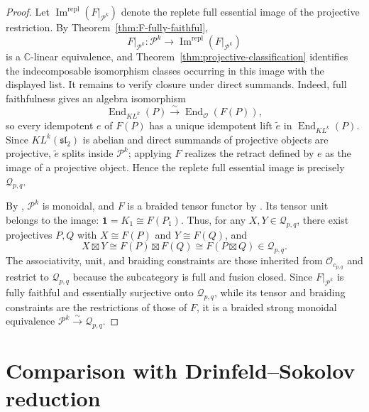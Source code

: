 \documentclass[12pt,leqno]{amsart}
\numberwithin{equation}{section}
\newcommand{\End}{\operatorname{End}}
\newcommand{\KL}{KL}
\newcommand{\Oc}{\mathcal O}
\def\C{\mathbb{C}}
\begin{document}
\begin{proof}
Let $\operatorname{Im}^{\mathrm{repl}}(F|_{\mathcal P^k})$ denote the
replete full essential image of the projective restriction.  By
Theorem~\ref{thm:F-fully-faithful},
\[
 F|_{\mathcal P^k}:\mathcal P^k
 \longrightarrow \operatorname{Im}^{\mathrm{repl}}(F|_{\mathcal P^k})
\]
is a $\C$-linear equivalence, and Theorem~\ref{thm:projective-classification}
identifies the indecomposable isomorphism classes occurring in this image
with the displayed list.  It remains to verify closure under direct
summands.  Indeed, full faithfulness gives an algebra isomorphism
\[
 \End_{\KL^k}(P)\xrightarrow{\sim}\End_{\Oc}(F(P)),
\]
so every idempotent $e$ of $F(P)$ has a unique idempotent lift
$\widetilde e$ in $\End_{\KL^k}(P)$.  Since $\KL^k(\mathfrak{sl}_2)$ is
abelian and direct summands of projective objects are projective,
$\widetilde e$ splits inside $\mathcal P^k$; applying $F$ realizes the
retract defined by $e$ as the image of a projective object.  Hence the
replete full essential image is precisely $\mathcal Q_{p,q}$.

By \cite[Theorem~6.6]{McRaeYang}, $\mathcal P^k$ is monoidal, and $F$ is
a braided tensor functor by \cite[Theorem~7.15]{McRaeYang}.  Its tensor
unit belongs to the image:
$\mathbf1=K_1\cong F(P_1)$.  Thus, for any $X,Y\in\mathcal Q_{p,q}$, there exist projectives $P,Q$
with $X\cong F(P)$ and $Y\cong F(Q)$, and
\[
 X\boxtimes Y\cong F(P)\boxtimes F(Q)
 \cong F(P\boxtimes Q)\in\mathcal Q_{p,q}.
\]
The associativity, unit, and braiding constraints are those inherited
from $\Oc_{c_{p,q}}$ and restrict to $\mathcal Q_{p,q}$ because the
subcategory is full and fusion closed.  Since $F|_{\mathcal P^k}$ is fully faithful and essentially surjective
onto $\mathcal Q_{p,q}$, while its tensor and braiding constraints are the
restrictions of those of $F$, it is a braided strong monoidal equivalence
$\mathcal P^k\xrightarrow{\sim}\mathcal Q_{p,q}$.
\end{proof}

\section{Comparison with Drinfeld--Sokolov reduction}\label{sec:comparison}
\end{document}
